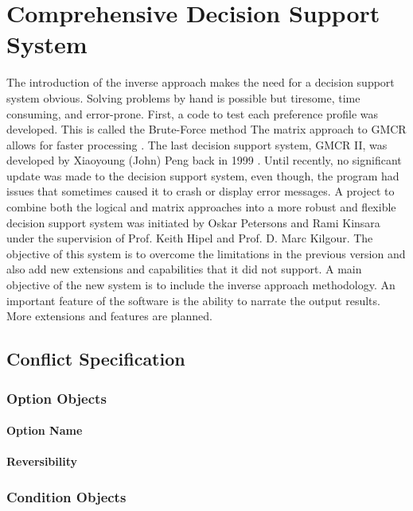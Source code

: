 \documentclass[letterpaper,12pt,titlepage,oneside,final]{book}
\begin{document}

\chapter{Comprehensive Decision Support System}

The introduction of the inverse approach makes the need for a decision support system obvious. Solving problems by hand is possible but tiresome, time consuming, and error-prone. First, a code to test each preference profile was developed. This is called the Brute-Force method
The matrix approach to GMCR allows for faster processing \citep{xu2007matrix,xu2009}. The last decision support system, GMCR II, was developed by Xiaoyoung (John) Peng back in 1999 \citep{peng1999decision}. Until recently, no significant update was made to the decision support system, even though, the program had issues that sometimes caused it to crash or display error messages.
A project to combine both the logical and matrix approaches into a more robust and flexible decision support system was initiated by Oskar Petersons and Rami Kinsara under the supervision of Prof. Keith Hipel and Prof. D. Marc Kilgour. The objective of this system is to overcome the limitations in the previous version and also add new extensions and capabilities that it did not support. A main objective of the new system is to include the inverse approach methodology. An important feature of the software is the ability to narrate the output results. More extensions and features are planned.

\section{Conflict Specification}

\subsection{Option Objects}

\subsubsection{Option Name}

\subsubsection{Reversibility}

\subsection{Condition Objects}
\end{document}
